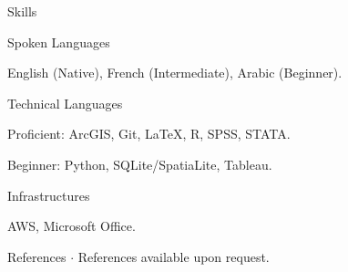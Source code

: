 \documentclass[10pt]{resume} %
\begin{document}
	\begin{rSection}{Skills} \itemsep -5pt
		
		\begin{rSubsection}{Spoken Languages}{}{}
			
			\item English (Native), French (Intermediate), Arabic (Beginner).
		
		\end{rSubsection}
		
		\begin{rSubsection}{Technical Languages}{}{}
			
			\item Proficient: ArcGIS, Git, \LaTeX, R, SPSS, STATA.
			
			\item Beginner: Python, SQLite/SpatiaLite, Tableau.
		
		\end{rSubsection}
		
		\begin{rSubsection}{Infrastructures}{}{}
			
			\item AWS, Microsoft Office.
		
		\end{rSubsection}
		
	\end{rSection}
	
	\begin{rSection}{References}
		$\cdot$ References available upon request. 
	\end{rSection}
	
\end{document}
